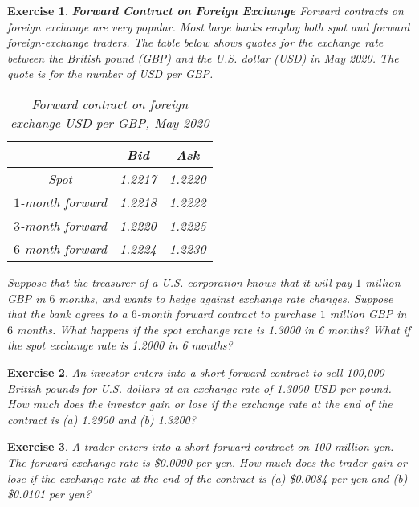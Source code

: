 \documentclass[letterpaper,10pt]{article}
\newtheorem{ex}{Exercise}
\begin{document}
\begin{ex}{\bf Forward Contract on Foreign Exchange}
Forward contracts on foreign exchange are very popular. Most large banks employ both spot and forward foreign-exchange traders.   The table below shows quotes for the exchange rate between the British pound (GBP) and the U.S. dollar (USD) in May 2020. The quote is for the number of USD per GBP.

\begin{center}
\begin{table}[h]
\begin{tabular}{|c|c|c|}\hline
&Bid&Ask\\\hline
Spot & 1.2217&1.2220\\\hline
$1$-month forward & 1.2218&1.2222\\\hline
$3$-month forward & 1.2220&1.2225\\\hline
$6$-month forward & 1.2224&1.2230\\\hline
\end{tabular}
\caption{Forward contract on foreign exchange USD per GBP, May 2020}
\end{table}
\end{center}

\noindent Suppose that the treasurer of a U.S. corporation knows that it will pay $1$ million GBP in $6$ months, and wants to hedge against exchange rate changes.  Suppose that the bank agrees to a $6$-month forward contract to purchase $1$ million GBP in $6$ months.  What happens if the spot exchange rate is 1.3000 in 6 months?  What if the spot exchange rate is 1.2000 in 6 months?

\end{ex}

\begin{ex}
An investor enters into a short forward contract to sell 100,000 British pounds for U.S. dollars at an exchange rate of 1.3000 USD per pound. How much does the investor gain or lose if the exchange rate at the end of the contract is (a) 1.2900 and (b) 1.3200?
\end{ex}

\begin{ex}
A trader enters into a short forward contract on 100 million yen. The forward exchange rate is \$0.0090 per yen. How much does the trader gain or lose if the exchange rate at the end of the contract is (a) \$0.0084 per yen and (b) \$0.0101 per yen?
\end{ex}

\newpage
\end{document}
